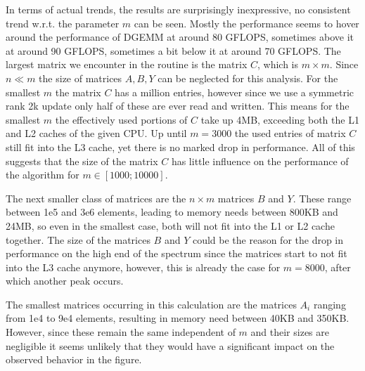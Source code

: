 \documentclass{scrartcl}
\begin{document}
	In terms of actual trends, the results are surprisingly inexpressive, no consistent trend w.r.t. the parameter $m$ can be seen.
	Mostly the performance seems to hover around the performance of DGEMM at around 80 GFLOPS, sometimes above it at around 90 GFLOPS, sometimes a bit below it at around 70 GFLOPS.
	The largest matrix we encounter in the routine is the matrix $C$, which is $m \times m$.
	Since $n \ll m$ the size of matrices $A, B, Y$ can be neglected for this analysis.
	For the smallest $m$ the matrix $C$ has a million entries, however since we use a symmetric rank 2k update only half of these are ever read and written.
	This means for the smallest $m$ the effectively used portions of $C$ take up 4MB, exceeding both the L1 and L2 caches of the given CPU.
	Up until $m=3000$ the used entries of matrix $C$ still fit into the L3 cache, yet there is no marked drop in performance.
	All of this suggests that the size of the matrix $C$ has little influence on the performance of the algorithm for $m \in [1000;10000]$.
	
	The next smaller class of matrices are the $n \times m$ matrices $B$ and $Y$.
	These range between 1e5 and 3e6 elements, leading to memory needs between 800KB and 24MB, so even in the smallest case, both will not fit into the L1 or L2 cache together.
	The size of the matrices $B$ and $Y$ could be the reason for the drop in performance on the high end of the spectrum since the matrices start to not fit into the L3 cache anymore, however, this is already the case for $m=8000$, after which another peak occurs.
	
	The smallest matrices occurring in this calculation are the matrices $A_i$ ranging from 1e4 to 9e4 elements, resulting in memory need between 40KB and 350KB.
	However, since these remain the same independent of $m$ and their sizes are negligible it seems unlikely that they would have a significant impact on the observed behavior in the figure.
	
\end{document}
